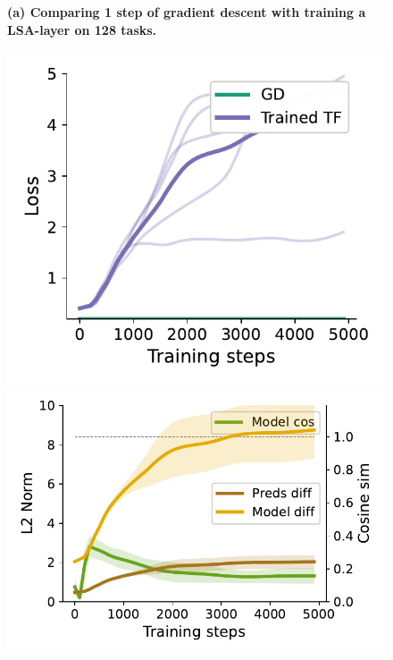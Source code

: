 \documentclass{article}
\theoremstyle{plain}
\theoremstyle{definition}
\theoremstyle{remark}
\begin{document}
\begin{figure}
\textbf{(a) Comparing 1 step of gradient descent with training a LSA-layer on 128 tasks.}
\begin{center}
\begin{minipage}{.24\textwidth}
  \centering
  \begin{center}
    \includegraphics[width=1.\textwidth]{Final_figures/cycle/128/train.pdf}
  \end{center}
  \vspace{-10pt}
\end{minipage}
\begin{minipage}{.24\textwidth}
  \centering
  \begin{center}
    \includegraphics[width=1.\textwidth]{Final_figures/cycle/128/sim.pdf}

\end{center}
\end{minipage}
\end{center}
\end{figure}
\end{document}

